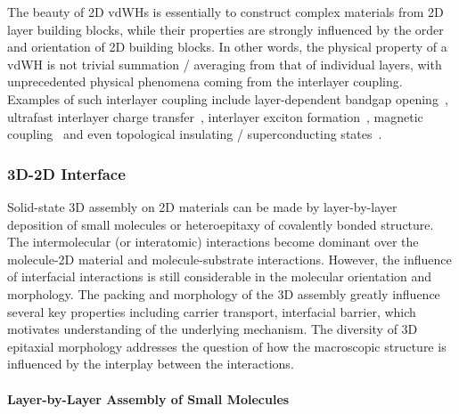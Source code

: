 The beauty of 2D vdWHs is essentially to construct complex materials
from 2D layer building blocks, while their properties are
strongly influenced by the order and orientation of 2D building
blocks.
%
In other words, the physical property of a vdWH is not trivial
summation / averaging from that of individual layers, with
unprecedented physical phenomena coming from the interlayer coupling.
%
Examples of such interlayer coupling include layer-dependent bandgap
opening~\autocite{Mak_2010_mos2,Raja_2017}, ultra\-fast interlayer charge
transfer~\autocite{Hong_2014_ultrafast_e_MoS2WS2,Zheng_2017_ultrafast_CT},
interlayer exciton formation~\autocite{Latini_2017_interlayer_ex},
magnetic coupling~\autocite{Huang_2017_magnet} and even topological
insulating / superconducting
states~\autocite{Cao_2018_insulator,Cao_2018_supercond}.


\subsubsection{3D-2D Interface}
\label{sec:intro-3D-2D}

Solid-state 3D assembly on 2D materials can be made by layer-by-layer
deposition of small molecules or hetero\-epitaxy of covalently bonded
structure. The intermolecular (or interatomic) interactions become
dominant over the molecule-2D material and molecule-substrate
interactions. However, the influence of interfacial interactions is
still considerable in the molecular orientation and morphology. The
packing and morphology of the 3D assembly greatly influence several
key properties including carrier transport, interfacial barrier, which
motivates understanding of the underlying mechanism.  The diversity of
3D epitaxial morphology addresses the question of how the macroscopic
structure is influenced by the interplay between the interactions.


\paragraph{Layer-by-Layer Assembly of Small Molecules}
\label{sec:org2cdd8f0}

